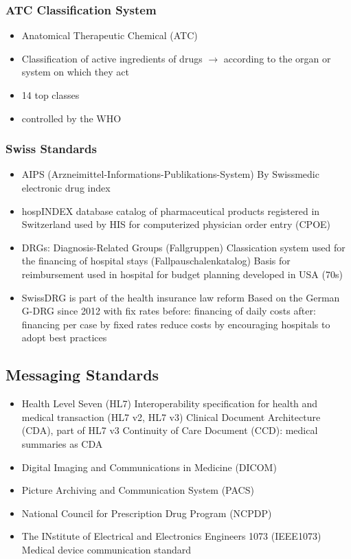 \documentclass{report}
\theoremstyle{definition}
\theoremstyle{example}
\begin{document}
\subsubsection{ATC Classification System}
\begin{itemize}
   \item Anatomical Therapeutic Chemical (ATC)
   \item Classification of active ingredients of drugs $\rightarrow$ according to the organ or system on which they act
   \item 14 top classes
   \item controlled by the WHO
\end{itemize}

\subsubsection{Swiss Standards}
\begin{itemize}
   \item AIPS (Arzneimittel-Informations-Publikations-System)
   \subitem By Swissmedic
   \subitem electronic drug index
   \item hospINDEX database
   \subitem catalog of pharmaceutical products registered in Switzerland
   \subitem used by HIS for computerized physician order entry (CPOE)
   \item DRGs: Diagnosis-Related Groups (Fallgruppen)
   \subitem Classication system used for the financing of hospital stays (Fallpauschalenkatalog)
   \subitem Basis for reimbursement
   \subitem used in hospital for budget planning
   \subitem developed in USA (70s) 
   \item SwissDRG is part of the health insurance law reform
   \subitem Based on the German G-DRG
   \subitem since 2012 with fix rates
   \subsubitem before: financing of daily costs
   \subsubitem after: financing per case by fixed rates
   \subitem reduce costs by encouraging hospitals to adopt best practices  
\end{itemize}

\subsection{Messaging Standards}
\begin{itemize}
   \item Health Level Seven (HL7)
   \subitem Interoperability specification for health and medical transaction (HL7 v2, HL7 v3)
   \subitem Clinical Document Architecture (CDA), part of HL7 v3
   \subitem Continuity of Care Document (CCD): medical summaries as CDA 
   \item Digital Imaging and Communications in Medicine (DICOM)
   \item Picture Archiving and Communication System (PACS)
   \item National Council for Prescription Drug Program (NCPDP)
   \item The INstitute of Electrical and Electronics Engineers 1073 (IEEE1073)
   \subitem Medical device communication standard 
\end{itemize}
\end{document}
